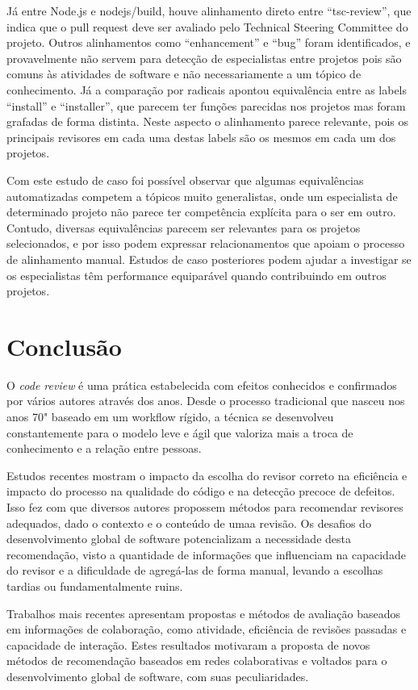 \documentclass[sigconf]{acmart}
\begin{document}
Já entre Node.js e nodejs/build, houve alinhamento direto entre ``tsc-review'', que indica que o pull request deve ser avaliado pelo Technical Steering Committee do projeto. Outros alinhamentos como ``enhancement'' e ``bug'' foram identificados, e provavelmente não servem para detecção de especialistas entre projetos pois são comuns às atividades de software e não necessariamente a um tópico de conhecimento. Já a comparação por radicais apontou equivalência entre as labels ``install'' e ``installer'', que parecem ter funções parecidas nos projetos mas foram grafadas de forma distinta. Neste aspecto o alinhamento parece relevante, pois os principais revisores em cada uma destas labels são os mesmos em cada um dos projetos.

Com este estudo de caso foi possível observar que algumas equivalências automatizadas competem a tópicos muito generalistas, onde um especialista de determinado projeto não parece ter competência explícita para o ser em outro. Contudo, diversas equivalências parecem ser relevantes para os projetos selecionados, e por isso podem expressar relacionamentos que apoiam o processo de alinhamento manual. Estudos de caso posteriores podem ajudar a investigar se os especialistas têm performance equiparável quando contribuindo em outros projetos.

\section{Conclusão}\label{cha:conclusao}

O \textit{code review} é uma prática estabelecida com efeitos conhecidos e confirmados por vários autores através dos anos. Desde o processo tradicional que nasceu nos anos 70" baseado em um workflow rígido, a técnica se desenvolveu constantemente para o modelo leve e ágil que valoriza mais a troca de conhecimento e a relação entre pessoas.

Estudos recentes mostram o impacto da escolha do revisor correto na eficiência e impacto do processo na qualidade do código e na detecção precoce de defeitos. Isso fez com que diversos autores propossem métodos para recomendar revisores adequados, dado o contexto e o conteúdo de umaa revisão. Os desafios do desenvolvimento global de software potencializam a necessidade desta recomendação, visto a quantidade de informações que influenciam na capacidade do revisor e a dificuldade de agregá-las de forma manual, levando a escolhas tardias ou fundamentalmente ruins.

Trabalhos mais recentes apresentam propostas e métodos de avaliação baseados em informações de colaboração, como atividade, eficiência de revisões passadas e capacidade de interação. Estes resultados motivaram a proposta de novos métodos de recomendação baseados em redes colaborativas e voltados para o desenvolvimento global de software, com suas peculiaridades.
\end{document}
